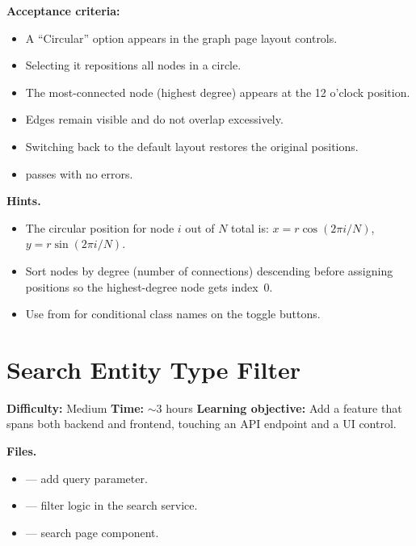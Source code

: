 \begin{tryit}
\textbf{Acceptance criteria:}
\begin{itemize}
    \item A ``Circular'' option appears in the graph page layout controls.
    \item Selecting it repositions all nodes in a circle.
    \item The most-connected node (highest degree) appears at the 12
          o'clock position.
    \item Edges remain visible and do not overlap excessively.
    \item Switching back to the default layout restores the original
          positions.
    \item {} passes with no errors.
\end{itemize}
\end{tryit}

\medskip\noindent\textbf{Hints.}

\begin{itemize}
    \item The circular position for node $i$ out of $N$ total is:
          $x = r \cos(2\pi i / N)$, $y = r \sin(2\pi i / N)$.
    \item Sort nodes by degree (number of connections) descending before
          assigning positions so the highest-degree node gets index~0.
    \item Use  from  for conditional class names
          on the toggle buttons.
\end{itemize}


\section{Search Entity Type Filter}
\label{sec:ex-search-filter}

\noindent\textbf{Difficulty:} Medium \quad
\textbf{Time:} $\sim$3 hours \quad
\textbf{Learning objective:} Add a feature that spans both backend and
frontend, touching an API endpoint and a UI control.

\medskip\noindent\textbf{Files.}

\begin{itemize}
    \item {} --- add query parameter.
    \item {} --- filter logic in the search
          service.
    \item {} --- search page component.
\end{itemize}

